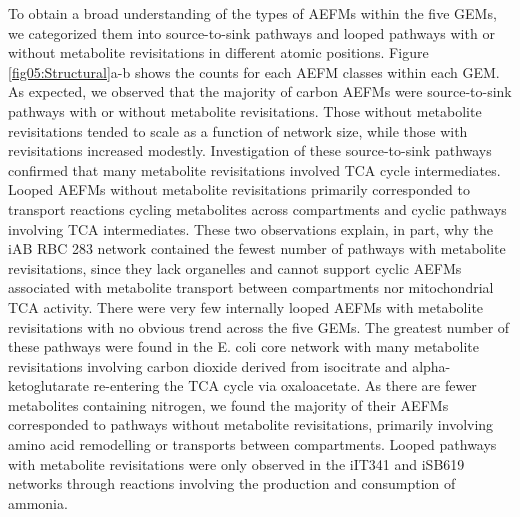 \documentclass[12pt]{article}
\begin{document}
To obtain a broad understanding of the types of AEFMs within the five
GEMs, we categorized them into source-to-sink pathways and looped pathways
with or without metabolite revisitations in different atomic positions.
Figure \ref{fig05:Structural}a-b shows the counts for each AEFM classes
within each GEM. As expected, we observed that the majority of carbon
AEFMs were source-to-sink pathways with or without metabolite
revisitations. Those without metabolite revisitations tended to scale as
a function of network size, while those with revisitations increased
modestly. Investigation of these source-to-sink pathways confirmed that
many metabolite revisitations involved TCA cycle intermediates. Looped
AEFMs without metabolite revisitations primarily corresponded to transport
reactions cycling metabolites across compartments and cyclic pathways
involving TCA intermediates. These two observations explain, in part, why
the iAB RBC 283 network contained the fewest number of pathways with
metabolite revisitations, since they lack organelles and cannot support
cyclic AEFMs associated with metabolite transport between compartments nor
mitochondrial TCA activity. There were very few internally looped AEFMs
with metabolite revisitations with no obvious trend across the five GEMs.
The greatest number of these pathways were found in the E. coli core
network with many metabolite revisitations involving carbon dioxide
derived from isocitrate and alpha-ketoglutarate re-entering the TCA cycle
via oxaloacetate. As there are fewer metabolites containing nitrogen, we
found the majority of their AEFMs corresponded to pathways without
metabolite revisitations, primarily involving amino acid remodelling or
transports between compartments. Looped pathways with metabolite
revisitations were only observed in the iIT341 and iSB619 networks through
reactions involving the production and consumption of ammonia. 
\end{document}
